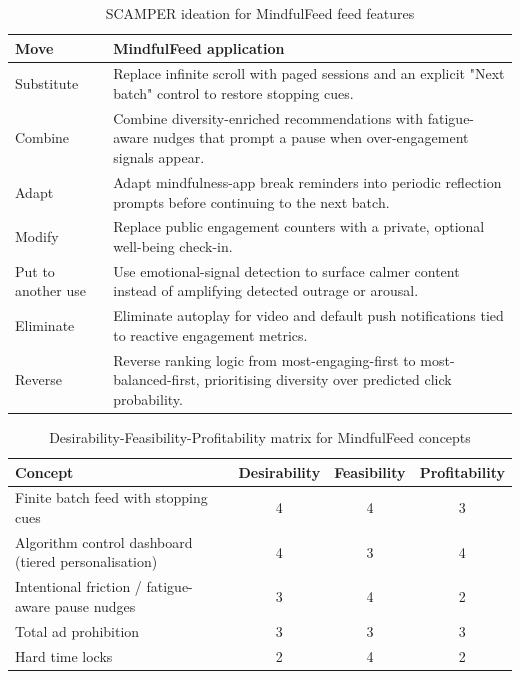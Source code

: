 \documentclass[11pt]{article}
\begin{document}
\begin{table}[H]
\centering
\caption{SCAMPER ideation for MindfulFeed feed features}
\label{tab:scamper_mindfulfeed}
\small
\begin{tabular}{p{2.8cm}p{11.5cm}}
\hline
\textbf{Move} & \textbf{MindfulFeed application} \\
\hline
Substitute & Replace infinite scroll with paged sessions and an explicit "Next batch" control to restore stopping cues. \\
Combine & Combine diversity-enriched recommendations with fatigue-aware nudges that prompt a pause when over-engagement signals appear. \\
Adapt & Adapt mindfulness-app break reminders into periodic reflection prompts before continuing to the next batch. \\
Modify & Replace public engagement counters with a private, optional well-being check-in. \\
Put to another use & Use emotional-signal detection to surface calmer content instead of amplifying detected outrage or arousal. \\
Eliminate & Eliminate autoplay for video and default push notifications tied to reactive engagement metrics. \\
Reverse & Reverse ranking logic from most-engaging-first to most-balanced-first, prioritising diversity over predicted click probability. \\
\hline
\end{tabular}
\end{table}

\begin{table}[H]
\centering
\caption{Desirability-Feasibility-Profitability matrix for MindfulFeed concepts}
\label{tab:dfp_mindfulfeed}
\small
\begin{tabular}{p{5.5cm}ccc}
\hline
\textbf{Concept} & \textbf{Desirability} & \textbf{Feasibility} & \textbf{Profitability} \\
\hline
Finite batch feed with stopping cues & 4 & 4 & 3 \\
Algorithm control dashboard (tiered personalisation) & 4 & 3 & 4 \\
Intentional friction / fatigue-aware pause nudges & 3 & 4 & 2 \\
Total ad prohibition & 3 & 3 & 3 \\
Hard time locks & 2 & 4 & 2 \\
\hline
\end{tabular}
\end{table}
\end{document}

